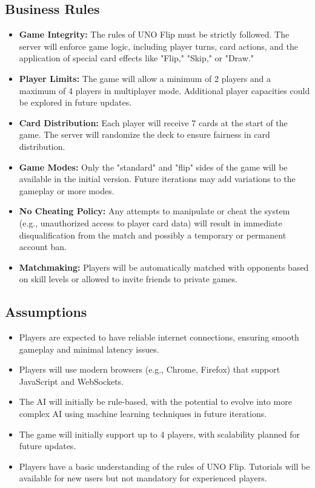 \documentclass{article}
\begin{document}
\subsection{Business Rules}
\begin{itemize}
    \item \textbf{Game Integrity:} The rules of UNO Flip must be strictly followed. The server will enforce game logic, including player turns, card actions, and the application of special card effects like "Flip," "Skip," or "Draw."
    \item \textbf{Player Limits:} The game will allow a minimum of 2 players and a maximum of 4 players in multiplayer mode. Additional player capacities could be explored in future updates.
    \item \textbf{Card Distribution:} Each player will receive 7 cards at the start of the game. The server will randomize the deck to ensure fairness in card distribution.
    \item \textbf{Game Modes:} Only the "standard" and "flip" sides of the game will be available in the initial version. Future iterations may add variations to the gameplay or more modes.
    \item \textbf{No Cheating Policy:} Any attempts to manipulate or cheat the system (e.g., unauthorized access to player card data) will result in immediate disqualification from the match and possibly a temporary or permanent account ban.
    \item \textbf{Matchmaking:} Players will be automatically matched with opponents based on skill levels or allowed to invite friends to private games.
\end{itemize}

\subsection{Assumptions}
\begin{itemize}
    \item Players are expected to have reliable internet connections, ensuring smooth gameplay and minimal latency issues.
    \item Players will use modern browsers (e.g., Chrome, Firefox) that support JavaScript and WebSockets.
    \item The AI will initially be rule-based, with the potential to evolve into more complex AI using machine learning techniques in future iterations.
    \item The game will initially support up to 4 players, with scalability planned for future updates.
    \item Players have a basic understanding of the rules of UNO Flip. Tutorials will be available for new users but not mandatory for experienced players.
\end{itemize}
\end{document}
